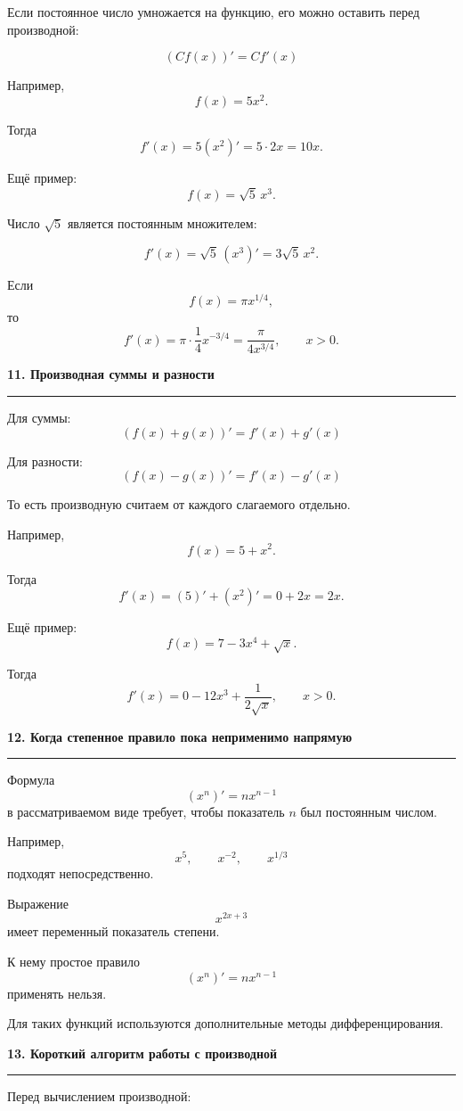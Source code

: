 \documentclass[a4paper,12pt]{article}
\newcommand{\lessonsection}[1]{%
    \vspace{0.5em}
    {\Large\bfseries\color{darkaccent}#1}\par
    \vspace{0.2em}
    {\color{accent}\rule{\linewidth}{0.6pt}}
    \vspace{0.5em}
}
\begin{document}
Если постоянное число умножается на функцию, его можно оставить перед производной:

\[
\boxed{
(Cf(x))'=C f'(x)
}
\]

Например,
\[
f(x)=5x^2.
\]

Тогда
\[
f'(x)
=
5(x^2)'
=
5\cdot2x
=
10x.
\]

Ещё пример:
\[
f(x)=\sqrt5\,x^3.
\]

Число \(\sqrt5\) является постоянным множителем:

\[
f'(x)
=
\sqrt5\,(x^3)'
=
3\sqrt5\,x^2.
\]

Если
\[
f(x)=\pi x^{1/4},
\]
то
\[
f'(x)
=
\pi\cdot\frac14x^{-3/4}
=
\frac{\pi}{4x^{3/4}},
\qquad x>0.
\]


\lessonsection{11. Производная суммы и разности}

Для суммы:
\[
\boxed{
(f(x)+g(x))'
=
f'(x)+g'(x)
}
\]

Для разности:
\[
\boxed{
(f(x)-g(x))'
=
f'(x)-g'(x)
}
\]

То есть производную считаем от каждого слагаемого отдельно.

Например,
\[
f(x)=5+x^2.
\]

Тогда
\[
f'(x)
=
(5)'+(x^2)'
=
0+2x
=
2x.
\]

Ещё пример:
\[
f(x)=7-3x^4+\sqrt{x}.
\]

Тогда
\[
f'(x)
=
0-12x^3+\frac1{2\sqrt{x}},
\qquad x>0.
\]


\lessonsection{12. Когда степенное правило пока неприменимо напрямую}

Формула
\[
(x^n)'=nx^{n-1}
\]
в рассматриваемом виде требует, чтобы показатель \(n\) был постоянным числом.

Например,
\[
x^5,\qquad
x^{-2},\qquad
x^{1/3}
\]
подходят непосредственно.

Выражение
\[
x^{2x+3}
\]
имеет переменный показатель степени.

К нему простое правило
\[
(x^n)'=nx^{n-1}
\]
применять нельзя.

Для таких функций используются дополнительные методы дифференцирования.


\lessonsection{13. Короткий алгоритм работы с производной}

Перед вычислением производной:
\end{document}
